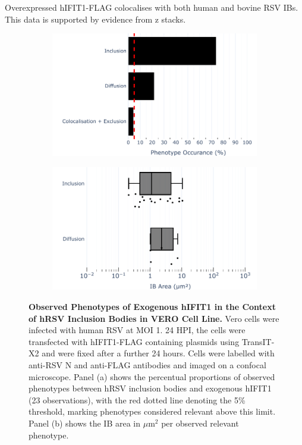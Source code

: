 Overexpressed hIFIT1-FLAG colocalises with both human and bovine RSV IBs. This data is supported by evidence from z stacks.

\begin{figure}
    \begin{subfigure}{0.495\textwidth}
        \caption{}
        \includegraphics[width=1\linewidth]{09. Chapter 4/Figs/02. Overexpression/01. IFIT1/01. bar_i1_hrsv.pdf} 
    \end{subfigure}
    \begin{subfigure}{0.495\textwidth}
        \caption{}
        \includegraphics[width=1\linewidth]{09. Chapter 4/Figs/02. Overexpression/01. IFIT1/02. box_i1_hrsv.pdf}
    \end{subfigure}
    \caption[Observed Phenotypes of Exogenous hIFIT1 in the Context of hRSV Inclusion Bodies in VERO Cell Line.]{\textbf{Observed Phenotypes of Exogenous hIFIT1 in the Context of hRSV Inclusion Bodies in VERO Cell Line.} Vero cells were infected with human RSV at MOI 1. 24 HPI, the cells were transfected with hIFIT1-FLAG containing plasmids using TransIT-X2 and were fixed after a further 24 hours. Cells were labelled with anti-RSV N and anti-FLAG antibodies and imaged on a confocal microscope. Panel (a) shows the percentual proportions of observed phenotypes between hRSV inclusion bodies and exogenous hIFIT1 (23 observations), with the red dotted line denoting the 5\% threshold, marking phenotypes considered relevant above this limit. Panel (b) shows the IB area in \(\mu \mbox{m}^2\) per observed relevant phenotype.}
    \label{fig:Observed Phenotypes of Exogenous hIFIT1 in the Context of hRSV Inclusion Bodies in VERO Cell Line}
\end{figure}

